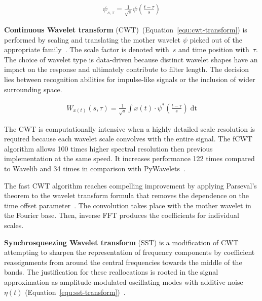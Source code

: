\begin{ceqn}\begin{align}
\psi_{s, \tau} = \frac{1}{\sqrt{s}}\psi\left(\frac{t - \tau}{s}\right)
\label{equ:mother-wavelet}
\end{align}\end{ceqn}

\textbf{Continuous Wavelet transform} (CWT)~(Equation~\ref{equ:cwt-transform}) is performed by scaling and translating the mother wavelet $\psi$ picked out of the appropriate family~\cite{nandi_condition_2019}. The scale factor is denoted with~$s$ and time position with~$\tau$. The choice of wavelet type is data-driven because distinct wavelet shapes have an impact on the response and ultimately contribute to filter length. The decision lies between recognition abilities for impulse-like signals or the inclusion of wider surrounding space.

\begin{ceqn}\begin{align}
W_{x(t)}(s, \tau) = \frac{1}{\sqrt{s}}\int x(t) \cdot \psi^*\left(\frac{t - \tau}{s}\right)\;\mathrm{dt}
\label{equ:cwt-transform}
\end{align}\end{ceqn}

The CWT is computationally intensive when a highly detailed scale resolution is required because each wavelet scale convolves with the entire signal. The fCWT algorithm allows 100 times higher spectral resolution then previous implementation at the same speed. It increases performance 122 times compared to Wavelib and 34 times in comparison with PyWavelets~\cite{arts_fast_2022}. 

The fast CWT algorithm reaches compelling improvement by applying Parseval's theorem to the wavelet transform formula that removes the dependence on the time offset parameter~\cite{arts_fast_2022}. The convolution takes place with the mother wavelet in the Fourier base. Then, inverse FFT produces the coefficients for individual scales.

\textbf{Synchrosqueezing Wavelet transform} (SST) is a modification of CWT attempting to sharpen the representation of frequency components by coefficient reassignments from around the central frequencies towards the middle of the bands. The justification for these reallocations is rooted in the signal approximation as amplitude-modulated oscillating modes with additive noise $\eta(t)$ (Equation~\ref{equ:sst-transform})~\cite{herrera_applications_2014}.

